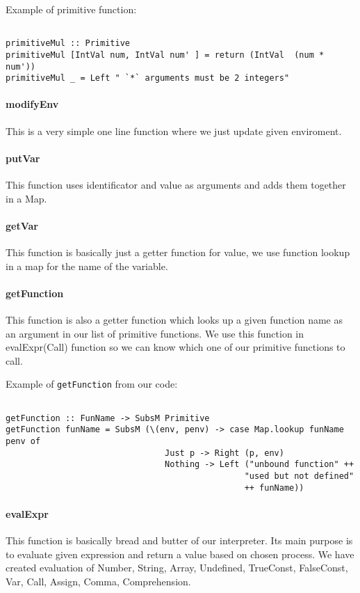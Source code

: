 \documentclass[11pt]{article}
\begin{document}
Example of primitive function:
\begin{verbatim}

primitiveMul :: Primitive
primitiveMul [IntVal num, IntVal num' ] = return (IntVal  (num * num'))
primitiveMul _ = Left " `*` arguments must be 2 integers"

\end{verbatim}

\paragraph{modifyEnv}
This is a very simple one line function where we just update given enviroment.
\paragraph{putVar}
This function uses identificator and value as arguments and adds them together in a Map.
\paragraph{getVar}
This function is basically just a getter function for value, we use function lookup in a map for the name of the variable.
\paragraph{getFunction}
This function is also a getter function which looks up a given function name as an argument in our list of primitive functions.
We use this function in evalExpr(Call) function so we can know which one of our primitive functions to call.

Example of \texttt{getFunction} from our code:
\begin{verbatim}

getFunction :: FunName -> SubsM Primitive
getFunction funName = SubsM (\(env, penv) -> case Map.lookup funName penv of
                                Just p -> Right (p, env)
                                Nothing -> Left ("unbound function" ++
                                                "used but not defined"
                                                ++ funName))
\end{verbatim}

\paragraph{evalExpr}
This function is basically bread and butter of our interpreter. Its main purpose is to evaluate given expression and return a value based on chosen process. We have created evaluation of Number, String, Array, Undefined, TrueConst, FalseConst, Var, Call, Assign, Comma, Comprehension. 
\end{document}
